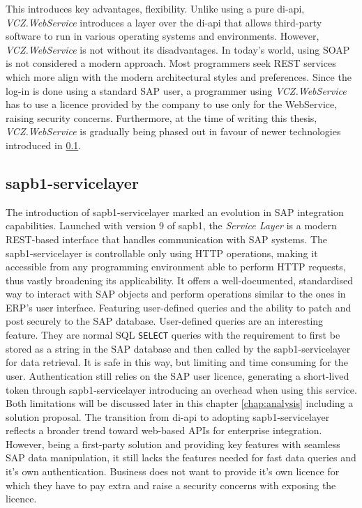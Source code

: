 This introduces key advantages, flexibility. 
Unlike using a pure \gls{di-api}, \textit{VCZ.WebService} introduces a layer over the \gls{di-api} that allows third-party software to run in various operating systems and environments.
However, \textit{VCZ.WebService} is not without its disadvantages.
In today's world, using \ac{SOAP} is not considered a modern approach. Most programmers seek \ac{REST} services which more align with the modern architectural styles and preferences.
Since the log-in is done using a standard SAP user, a programmer using \textit{VCZ.WebService} has to use a licence provided by the company to use only for the WebService, raising security concerns.
Furthermore, at the time of writing this thesis, \textit{VCZ.WebService} is gradually being phased out in favour of newer technologies introduced in \ref{subsec:sap-b1-service-layer}.

\subsection{\gls{sapb1-servicelayer}}
\label{subsec:sap-b1-service-layer}

The introduction of \gls{sapb1-servicelayer} marked an evolution in SAP integration capabilities. 
Launched with version 9 of \gls{sapb1}, the \textit{Service Layer} is a modern \ac{REST}-based interface that handles communication with SAP systems. 
The \gls{sapb1-servicelayer} is controllable only using HTTP operations, making it accessible from any programming environment able to perform HTTP requests, thus vastly broadening its applicability.
It offers a well-documented, standardised way to interact with SAP objects and perform operations similar to the ones in \ac{ERP}'s user interface. 
Featuring user-defined queries and the ability to patch and post securely to the SAP database.
User-defined queries are an interesting feature. They are normal SQL \texttt{SELECT} queries with the requirement to first be stored as a string in the SAP database and then called by the \gls{sapb1-servicelayer} for data retrieval.
It is safe in this way, but limiting and time consuming for the user. 
Authentication still relies on the SAP user licence, generating a short-lived token through \gls{sapb1-servicelayer} introducing an overhead when using this service.
Both limitations will be discussed later in this chapter \ref{chap:analysis} including a solution proposal.
The transition from \gls{di-api} to adopting \gls{sapb1-servicelayer} reflects a broader trend toward web-based APIs for enterprise integration.
However, being a first-party solution and providing key features with seamless SAP data manipulation, it still lacks the features needed for fast data queries and it's own authentication. Business does not want to provide it's own licence for which they have to pay extra and raise a security concerns with exposing the licence.

